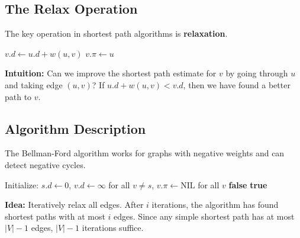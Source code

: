 \subsection{The Relax Operation}

The key operation in shortest path algorithms is \textbf{relaxation}.

\begin{algorithm}[H]
\caption{Relax Operation}
\begin{algorithmic}[1]
    \State $v.d \gets u.d + w(u,v)$ 
    \State $v.\pi \gets u$ 
  \EndIf
\EndProcedure
\end{algorithmic}
\end{algorithm}

\textbf{Intuition:} Can we improve the shortest path estimate for $v$ by going through $u$ 
and taking edge $(u,v)$? If $u.d + w(u,v) < v.d$, then we have found a better path to $v$.

\subsection{Algorithm Description}

The Bellman-Ford algorithm works for graphs with negative weights and can detect negative cycles.

\begin{algorithm}[H]
\caption{Bellman-Ford Algorithm}
\begin{algorithmic}[1]
  \State Initialize: $s.d \gets 0$, $v.d \gets \infty$ for all $v \neq s$, $v.\pi \gets \text{NIL}$ for all $v$
      \State {}
    \EndFor
  \EndFor
   
      \State \Return \textbf{false} 
    \EndIf
  \EndFor
  \State \Return \textbf{true}
\EndProcedure
\end{algorithmic}
\end{algorithm}

\textbf{Idea:} Iteratively relax all edges. After $i$ iterations, the algorithm has found 
shortest paths with at most $i$ edges. Since any simple shortest path has at most $|V|-1$ edges, 
$|V|-1$ iterations suffice.

